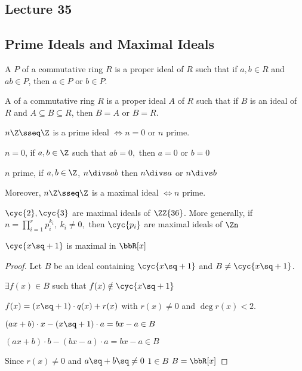 \subsection*{Lecture 35} %
\subsection{Prime Ideals and Maximal Ideals}
\begin{definition}
  A  \( P \) of a commutative ring \( R \) is a proper ideal of \( R \) such that if \( a,b\in R \) and \( ab\in P \), then \( a\in P \) or \( b\in P \).

  A  of a commutative ring \( R \) is a proper ideal \( A \) of \( R \) such that if \( B \) is an ideal of \( R \) and \( A\subseteq B\subseteq R \), then \( B=A \) or \( B=R \).
\end{definition}

\begin{example}
  \( n\Z \sseq \Z \) is a prime ideal \( \iff n=0 \) or \( n \) prime.

  \begin{note}
    \( n = 0 \), if \( a,b\in \Z \) such that \( ab = 0, \) then \( a=0 \) or \( b=0 \) \checkmark

    \( n \) prime, if \( a,b\in\Z \), \( n\divs ab \) then \( n\divs a  \) or \( n\divs b \) \checkmark
  \end{note}
  Moreover, \( n\Z\sseq\Z \) is a maximal ideal \( \iff n \) prime.
\end{example}

\begin{example}
  \( \cyc{2}, \cyc{3} \) are maximal ideals of \( \ZZ{36} \). More generally, if \( n=\prod_{i=1}^{r} p_{i}^{k_{i}},\ k_i\neq 0,\) then \( \cyc{p_i} \) are maximal ideals of \( \Zn \)
\end{example}

\begin{example}
  \( \cyc{x\sq +1} \) is maximal in \( \bbR[x] \)
\end{example}

\begin{proof}
  Let \( B \) be an ideal containing \( \cyc{x\sq + 1} \) and \( B\neq \cyc{x\sq + 1} \).

  \imp \( \exists f(x) \in B \) such that \( f(x) \notin \cyc{x\sq + 1} \)

  \imp \( f(x) = (x\sq+1) \cdot q(x) + r(x) \) with \( r(x)\neq 0 \) and \( \deg r(x) <2 \).

  \imp \( (ax+b) \cdot x - (x\sq+1)\cdot a = bx-a \in B \)

  \imp \( (ax+b) \cdot b - (bx-a)\cdot a = bx-a \in B \)

  Since \( r(x) \neq 0 \) and \( a\sq+b\sq \neq 0 \) \imp \( 1\in B \) \imp \( B = \bbR[x] \)
\end{proof}

